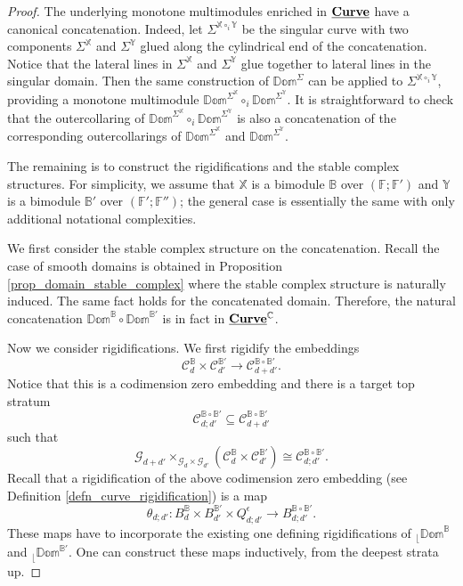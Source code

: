 \documentclass[reqno, 10pt]{amsart}
\numberwithin{equation}{section}
\numberwithin{equation}{section}
\renewcommand{\subset}{\subseteq}
\theoremstyle{definition}
\theoremstyle{remark}
\newcommand{\beqn}{\begin{equation*}}
\newcommand{\eeqn}{\end{equation*}}
\newcommand{\mb}{\mathbb}
\newcommand{\mc}{\mathcal}
\renewcommand{\outer}{{}_{\lfloor}}
\newcommand{\uds}[1]{\underline{\smash{#1}}}
\begin{document}
\begin{proof}
The underlying monotone multimodules enriched in $\uds{\bf Curve}$ have a canonical concatenation. Indeed, let $\Sigma^{{\mb X} \circ_i {\mb Y}}$ be the singular curve with two components $\Sigma^{{\mb X}}$ and $\Sigma^{{\mb Y}}$ glued along the cylindrical end of the concatenation. Notice that the lateral lines in $\Sigma^{\mb X}$ and $\Sigma^{\mb Y}$ glue together to lateral lines in the singular domain. Then the same construction of $\mb{Dom}^{\Sigma}$ can be applied to $\Sigma^{{\mb X}\circ_i {\mb Y}}$, providing a monotone multimodule $\mb{Dom}^{\Sigma^{\mb X}} \circ_i \mb{Dom}^{\Sigma^{\mb Y}}$. It is straightforward to check that the outercollaring of $\mb{Dom}^{\Sigma^{\mb X}} \circ_i \mb{Dom}^{\Sigma^{\mb Y}}$ is also a concatenation of the corresponding outercollarings of $\mb{Dom}^{\Sigma^{\mb X}}$ and $\mb{Dom}^{\Sigma^{\mb Y}}$. 

The remaining is to construct the rigidifications and the stable complex structures. For simplicity, we assume that ${\mb X}$ is a bimodule $\mb{B}$ over $({\mb F}; {\mb F}')$ and ${\mb Y}$ is a bimodule ${\mb B}'$ over $({\mb F}'; {\mb F}'')$; the general case is essentially the same with only additional notational complexities. 

We first consider the stable complex structure on the concatenation. Recall the case of smooth domains is obtained in Proposition \ref{prop_domain_stable_complex} where the stable complex structure is naturally induced. The same fact holds for the concatenated domain. Therefore, the natural concatenation $\mb{Dom}^{{\mb B}} \circ \mb{Dom}^{{\mb B}'}$ is in fact in $\uds{\bf Curve}^{\mb C}$. 

Now we consider rigidifications. We first rigidify the embeddings
\beqn
{\mc C}_{d}^{\mb{B}} \times {\mc C}_{d'}^{\mb{B}'} \to {\mc C}_{d + d'}^{{\mb B} \circ {\mb B}'}.
\eeqn
Notice that this is a codimension zero embedding and there is a target top stratum 
\beqn
{\mc C}_{d; d'}^{{\mb B} \circ {\mb B}'} \subset {\mc C}_{d + d'}^{{\mb B} \circ {\mb B}'}
\eeqn
such that 
\beqn
{\mc G}_{d + d'} \times_{{\mc G}_d \times {\mc G}_{d'}} ({\mc C}_{d}^{\mb{B}} \times {\mc C}_{d'}^{\mb{B}'}) \cong {\mc C}_{d; d'}^{\mb{B}\circ \mb{B}'}.
\eeqn 
Recall that a rigidification of the above codimension zero embedding (see Definition \ref{defn_curve_rigidification}) is a map 
\beqn
\theta_{d; d'}: B_{d}^{\mb{B}} \times B_{d'}^{\mb{B}'} \times Q_{d; d'}^\epsilon \to B_{d; d'}^{\mb{B} \circ \mb{B}'}.
\eeqn
These maps have to incorporate the existing one defining rigidifications of $\outer \mb{Dom}^{\mb{B} }$ and $\outer \mb{Dom}^{\mb{B}'}$. One can construct these maps inductively, from the deepest strata up. 


\end{proof}
\end{document}
